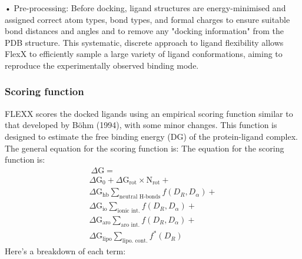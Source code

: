 \documentclass[11pt]{article}
\begin{document}
• Pre-processing: Before docking, ligand structures are energy-minimised and assigned correct atom types, bond types, and formal charges to ensure suitable bond distances and angles and to remove any "docking information" from the PDB structure.
This systematic, discrete approach to ligand flexibility allows FlexX to efficiently sample a large variety of ligand conformations, aiming to reproduce the experimentally observed binding mode.

\subsubsection*{Scoring function}
FLEXX scores the docked ligands using an empirical scoring function similar to that developed by Böhm (1994), with some minor changes. This function is designed to estimate the free binding energy (DG) of the protein-ligand complex.
The general equation for the scoring function is:
The equation for the scoring function is:
\begin{equation} \label{eq:flexscoring}
\begin{split}
\ \Delta \text{G} = \\ 
                    \Delta \text{G}_0 + \Delta\text{G}_{\text{rot}} \times \text{N}_{\text{rot}} + \\
                    \Delta\text{G}_{\text{hb}}\sum_{\text{neutral H-bonds}} f(D_R, D_\alpha) + \\
                    \Delta\text{G}_{\text{io}}\sum_{\text{ionic int.}} f(D_R, D_\alpha) + \\ 
                    \Delta \text{G}_{\text{aro}}\sum_{\text{aro int.}} f(D_R, D_\alpha) + \\
                    \Delta \text{G}_{\text{lipo}}\sum_{\text{lipo. cont.}} f^*(D_R) 
\end{split}
\end{equation}
Here's a breakdown of each term:
\end{document}
